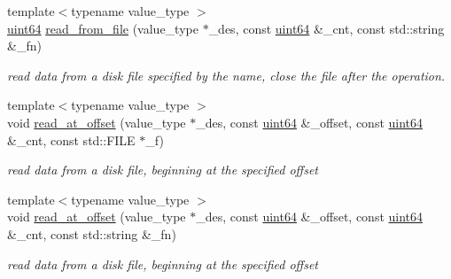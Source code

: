 \begin{DoxyCompactItemize}
{\footnotesize template$<$typename value\+\_\+type $>$ }\\\hyperlink{types_8h_a60e8696a4678cd348e991a1f172e53f7}{uint64} \hyperlink{class_basic_i_o_a7e492b3c92dbb91e7f45cd5ed03365a3}{read\+\_\+from\+\_\+file} (value\+\_\+type $\ast$\+\_\+des, const \hyperlink{types_8h_a60e8696a4678cd348e991a1f172e53f7}{uint64} \&\+\_\+cnt, const std\+::string \&\+\_\+fn)
\begin{DoxyCompactList}\small\item\em read data from a disk file specified by the name, close the file after the operation. \end{DoxyCompactList}\item 
{\footnotesize template$<$typename value\+\_\+type $>$ }\\void \hyperlink{class_basic_i_o_a7aed99607484ece4b385e3fdced47e1c}{read\+\_\+at\+\_\+offset} (value\+\_\+type $\ast$\+\_\+des, const \hyperlink{types_8h_a60e8696a4678cd348e991a1f172e53f7}{uint64} \&\+\_\+offset, const \hyperlink{types_8h_a60e8696a4678cd348e991a1f172e53f7}{uint64} \&\+\_\+cnt, const std\+::\+F\+I\+LE $\ast$\+\_\+f)
\begin{DoxyCompactList}\small\item\em read data from a disk file, beginning at the specified offset \end{DoxyCompactList}\item 
{\footnotesize template$<$typename value\+\_\+type $>$ }\\void \hyperlink{class_basic_i_o_a934ed5d36b8a132b622c59c61b881bdd}{read\+\_\+at\+\_\+offset} (value\+\_\+type $\ast$\+\_\+des, const \hyperlink{types_8h_a60e8696a4678cd348e991a1f172e53f7}{uint64} \&\+\_\+offset, const \hyperlink{types_8h_a60e8696a4678cd348e991a1f172e53f7}{uint64} \&\+\_\+cnt, const std\+::string \&\+\_\+fn)
\begin{DoxyCompactList}\small\item\em read data from a disk file, beginning at the specified offset \end{DoxyCompactList}\end{DoxyCompactItemize}

